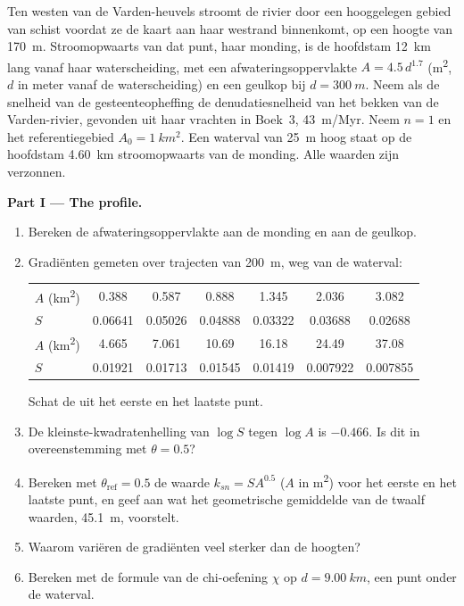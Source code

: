 \begin{problem}
\label{pb:b3:quantitative-geomorphology:1}
Ten westen van de Varden-heuvels stroomt de rivier door een hooggelegen gebied van
schist voordat ze de kaart aan haar westrand binnenkomt, op een hoogte van \qty{170}{m}. Stroomopwaarts
van dat punt, haar monding, is de hoofdstam \qty{12}{km} lang vanaf haar
waterscheiding, met een afwateringsoppervlakte $A = 4.5\,d^{1.7}$ (\unit{m^2}, $d$ in meter vanaf de
waterscheiding) en een geulkop bij $d = \qty{300}{m}$. Neem als de snelheid van de
gesteenteopheffing de denudatiesnelheid van het bekken van de Varden-rivier, gevonden uit
haar vrachten in Boek~3, \qty{43}{m/Myr}. Neem $n = 1$ en het referentiegebied $A_0 = \qty{1}{km^2}$.
Een waterval van \qty{25}{m} hoog staat op de hoofdstam \qty{4.60}{km} stroomopwaarts van de
monding. Alle waarden zijn verzonnen.

\medskip\noindent\textbf{Part I --- The profile.}
\begin{enumerate}
\item Bereken de afwateringsoppervlakte aan de monding en aan de geulkop.
\item Gradiënten gemeten over trajecten van \qty{200}{m}, weg van de
  waterval:

  \smallskip
  {\small\begin{tabular}{l*{6}{c}}
  $A$ (\unit{km^2}) & 0.388 & 0.587 & 0.888 & 1.345 & 2.036 & 3.082 \\
  $S$ & 0.06641 & 0.05026 & 0.04888 & 0.03322 & 0.03688 & 0.02688 \\[2pt]
  $A$ (\unit{km^2}) & 4.665 & 7.061 & 10.69 & 16.18 & 24.49 & 37.08 \\
  $S$ & 0.01921 & 0.01713 & 0.01545 & 0.01419 & 0.007922 & 0.007855
  \end{tabular}}

  \smallskip
  Schat de  uit het eerste en het laatste punt.
\item De kleinste-kwadratenhelling van $\log S$ tegen $\log A$ is $-0.466$.
  Is dit in overeenstemming met $\theta = 0.5$?
\item Bereken met $\theta_{\mathrm{ref}} = 0.5$ de waarde $k_{sn} = S A^{0.5}$ ($A$ in
  \unit{m^2}) voor het eerste en het laatste punt, en geef aan wat het
  geometrische gemiddelde van de twaalf waarden, \qty{45.1}{m}, voorstelt.
\item Waarom variëren de gradiënten veel sterker dan de hoogten?
\item Bereken met de formule van de chi-oefening $\chi$ op $d =
  \qty{9.00}{km}$, een punt onder de waterval.
\end{enumerate}


\end{problem}
